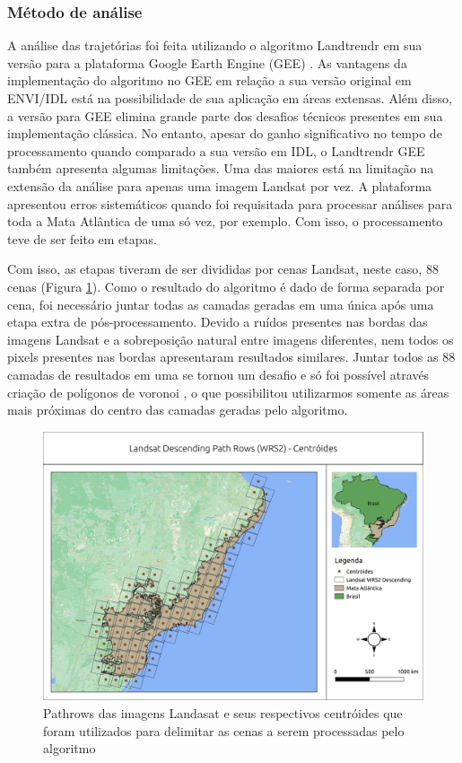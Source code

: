 \subsubsection{Método de análise}
\hspace{13pt} A análise das trajetórias foi feita utilizando o algoritmo Landtrendr em sua versão para a plataforma Google Earth Engine (GEE) \citep{Kennedy2018}. As vantagens da implementação do algoritmo no GEE em relação a sua versão original em ENVI/IDL está na possibilidade de sua aplicação em áreas extensas. Além disso, a versão para GEE elimina grande parte dos desafios técnicos presentes em sua implementação clássica. No entanto, apesar do ganho significativo no tempo de processamento quando comparado a sua versão em IDL, o Landtrendr GEE também apresenta algumas limitações. Uma das maiores está na limitação na extensão da análise para apenas uma imagem Landsat por vez. A plataforma apresentou erros sistemáticos quando foi requisitada para processar análises para toda a Mata Atlântica de uma só vez, por exemplo. Com isso, o processamento teve de ser feito em etapas. 

Com isso, as etapas tiveram de ser divididas por cenas Landsat, neste caso, 88 cenas (Figura \ref{fig:pathrow_centroids}). Como o resultado do algoritmo é dado de forma separada por cena, foi necessário juntar todas as camadas geradas em uma única após uma etapa extra de pós-processamento. Devido a ruídos presentes nas bordas das imagens Landsat e a sobreposição natural entre imagens diferentes, nem todos os pixels presentes nas bordas apresentaram resultados similares. Juntar todos as 88 camadas de resultados em uma se tornou um desafio e só foi possível através criação de polígonos de voronoi \citep{Okabe}, o que possibilitou utilizarmos somente as áreas mais próximas do centro das camadas geradas pelo algoritmo. 

\begin{figure}[h!]
    \centering
    \includegraphics[scale=.5]{images/ma_pathrow_centroids.png}
    \caption{Pathrows das imagens Landasat e seus respectivos centróides que foram utilizados para delimitar as cenas a serem processadas pelo algoritmo}
    \label{fig:pathrow_centroids}
\end{figure}

